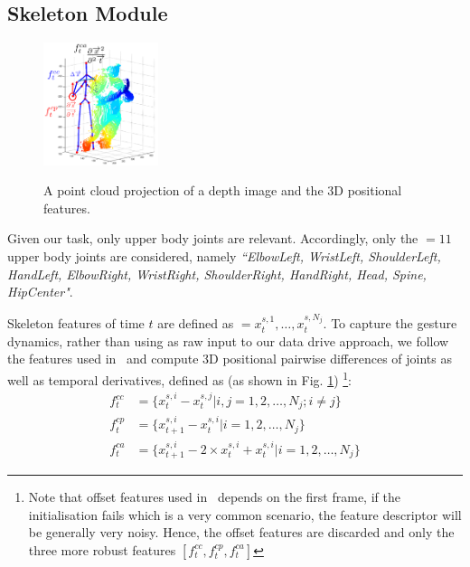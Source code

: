 \subsection{Skeleton Module}\label{sec:skeleton_module}
\begin{figure}[t]
  \centering
  \includegraphics[width=0.3\textwidth]{images/point_cloud}\\
  \caption{
    A point cloud projection of a depth image and the 3D positional features.}
    \label{point_cloud}
\end{figure}




Given our task, only upper body joints are relevant. Accordingly, only the \numberofjoints{}$ =11$ upper body joints are considered, namely \emph{``ElbowLeft, WristLeft, ShoulderLeft, HandLeft, ElbowRight, WristRight, ShoulderRight, HandRight, Head, Spine, HipCenter"}.

Skeleton features of time $t$ are defined as \skfeaturet{}$=x_t^{s,1}, \ldots, x_t^{s, N_j}$. To capture the gesture dynamics, rather than using \skfeaturet{} as raw input to our data drive approach, we follow the features used in~\cite{diwucvpr14} and compute 3D positional pairwise differences of joints as well as temporal derivatives, defined as (as shown in Fig. \ref{point_cloud}) \footnote{Note that offset features used in~\cite{diwucvpr14} depends on the first frame, if the initialisation fails which is a very common scenario, the feature descriptor will be generally very noisy. Hence, the offset features are discarded and only the three more robust features $[f^{cc}_t, f^{cp}_t, f^{ca}_t]$}:
\begin{align}
f^{cc}_t&=\{x_t^{s,i}-x_t^{s,j} | i,j=1,2,\ldots, N_j; i\neq j\} \label{sk_features_1}\\
f^{cp}_t&=\{x_{t+1}^{s,i}-x_t^{s,i} |  i=1,2,\ldots, N_j\} \label{sk_features_2}\\
f^{ca}_t&=\{x_{t+1}^{s,i} - 2 \times x_t^{s,i} + x_t^{s,i} | i=1,2,\ldots, N_j  \} \label{sk_features_3}
\end{align}


